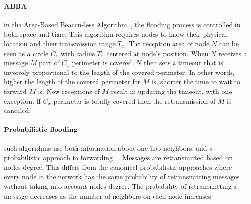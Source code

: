 \paragraph{ABBA} in the Area-Based Beacon-less Algorithm~\cite{Ovalle-Martinez2006}, the flooding process is controlled in both space and time.
%
This algorithm requires nodes to know their physical location and their transmission range $T_x$.
%
The reception area of node $N$ can be seen as a circle $C_x$ with radius $T_x$ centered at node's position.
%
When $N$ receives a message $M$ part of $C_x$ perimeter is covered, $N$ then sets a timeout that is inversely proportional to the length of the covered perimeter.
%
In other words, higher the length of the covered perimeter for $M$ is,
shorter the time to wait to forward $M$ is.
%
New receptions of $M$ result in updating the timeout, with one exception. If $C_x$ perimeter is totally covered then the retransmission of $M$ is canceled.
%
%
%
%
%
%

\paragraph{Probabilistic flooding} such algorithms use both information about one-hop neighbors, and a probabilistic approach to forwarding ~\cite{Cartigny:2003:BNR:2727141.2727459}.
%
Messages are retransmitted based on nodes degree.
%
This differs from the canonical probabilistic approaches where every node in the network has the same probability of retransmitting messages without taking into account nodes degree.
%
%
The probability of retransmitting a message decreases as the number of neighbors on each node increases.




